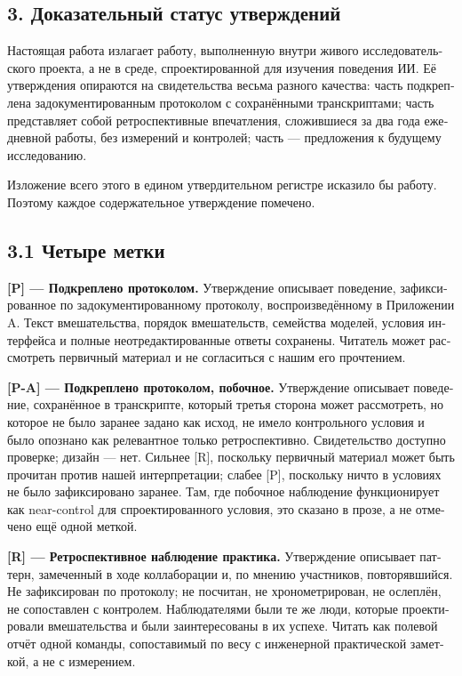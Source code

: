 \begin{russian}
\section*{3. Доказательный статус утверждений}
\label{sec:ru:3}

Настоящая работа излагает работу, выполненную внутри живого исследовательского проекта, а не в среде, спроектированной для изучения поведения ИИ. Её утверждения опираются на свидетельства весьма разного качества: часть подкреплена задокументированным протоколом с сохранёнными транскриптами; часть представляет собой ретроспективные впечатления, сложившиеся за два года ежедневной работы, без измерений и контролей; часть — предложения к будущему исследованию.

Изложение всего этого в едином утвердительном регистре исказило бы работу. Поэтому каждое содержательное утверждение помечено.


\subsection*{3.1 Четыре метки}
\label{sec:ru:3.1}

\textbf{[P] — Подкреплено протоколом.} Утверждение описывает поведение, зафиксированное по задокументированному протоколу, воспроизведённому в Приложении A. Текст вмешательства, порядок вмешательств, семейства моделей, условия интерфейса и полные неотредактированные ответы сохранены. Читатель может рассмотреть первичный материал и не согласиться с нашим его прочтением.

\textbf{[P-A] — Подкреплено протоколом, побочное.} Утверждение описывает поведение, сохранённое в транскрипте, который третья сторона может рассмотреть, но которое не было заранее задано как исход, не имело контрольного условия и было опознано как релевантное только ретроспективно. Свидетельство доступно проверке; дизайн — нет. Сильнее [R], поскольку первичный материал может быть прочитан против нашей интерпретации; слабее [P], поскольку ничто в условиях не было зафиксировано заранее. Там, где побочное наблюдение функционирует как near-control для спроектированного условия, это сказано в прозе, а не отмечено ещё одной меткой.

\textbf{[R] — Ретроспективное наблюдение практика.} Утверждение описывает паттерн, замеченный в ходе коллаборации и, по мнению участников, повторявшийся. Не зафиксирован по протоколу; не посчитан, не хронометрирован, не ослеплён, не сопоставлен с контролем. Наблюдателями были те же люди, которые проектировали вмешательства и были заинтересованы в их успехе. Читать как полевой отчёт одной команды, сопоставимый по весу с инженерной практической заметкой, а не с измерением.


\end{russian}
